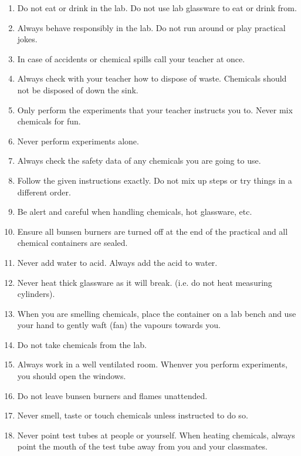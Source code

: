 \label{m38491*id634222}\begin{enumerate}[noitemsep, label=\textbf{\arabic*}. ] 
            \label{m38491*id632}\item Do not eat or drink in the lab. Do not use lab glassware to eat or drink from.
\label{m38491*id6124}\item Always behave responsibly in the lab. Do not run around or play practical jokes.
\label{m38491*id6342}\item In case of accidents or chemical spills call your teacher at once.
\label{m38491*id7324}\item Always check with your teacher how to dispose of waste. Chemicals should not be disposed of down the sink.
\label{m38491*id632324}\item Only perform the experiments that your teacher instructs you to. Never mix chemicals for fun.
\label{m38491*id6242313}\item Never perform experiments alone. 
\label{m38491*id5512}\item Always check the safety data of any chemicals you are going to use. 
\label{m38491*id523465}\item Follow the given instructions exactly. Do not mix up steps or try things in a different order.
\label{m38491*id73221}\item Be alert and careful when handling chemicals, hot glassware, etc.  
\label{m38491*id5621}\item Ensure all bunsen burners are turned off at the end of the practical and all chemical containers are sealed.
\item Never add water to acid. Always add the acid to water.
\item Never heat thick glassware as it will break. (i.e. do not heat measuring cylinders).
\item When you are smelling chemicals, place the container on a lab bench and use your hand to gently waft (fan) the vapours towards you.
\item Do not take chemicals from the lab.
\item Always work in a well ventilated room. Whenver you perform experiments, you should open the windows.
\item Do not leave bunsen burners and flames unattended. 
\item Never smell, taste or touch chemicals unless instructed to do so.
\item Never point test tubes at people or yourself. When heating chemicals, always point the mouth of the test tube away from you and your classmates.
\end{enumerate}
\par 
